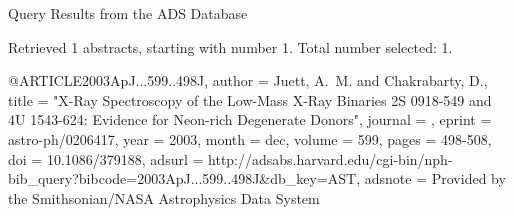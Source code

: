 Query Results from the ADS Database


Retrieved 1 abstracts, starting with number 1.  Total number selected: 1.

@ARTICLE{2003ApJ...599..498J,
   author = {{Juett}, A.~M. and {Chakrabarty}, D.},
    title = "{X-Ray Spectroscopy of the Low-Mass X-Ray Binaries 2S 0918-549 and 4U 1543-624: Evidence for Neon-rich Degenerate Donors}",
  journal = {\apj},
   eprint = {astro-ph/0206417},
     year = 2003,
    month = dec,
   volume = 599,
    pages = {498-508},
      doi = {10.1086/379188},
   adsurl = {http://adsabs.harvard.edu/cgi-bin/nph-bib_query?bibcode=2003ApJ...599..498J&db_key=AST},
  adsnote = {Provided by the Smithsonian/NASA Astrophysics Data System}
}


